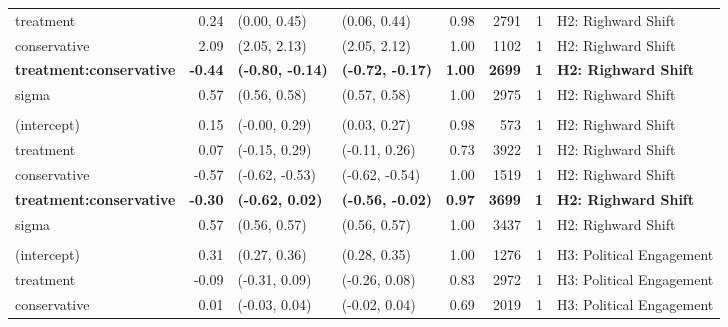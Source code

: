 \begin{table}[!h]
\begin{tabular}[t]{lrllrrrl}
\hspace{1em}treatment & 0.24 & (0.00, 0.45) & (0.06, 0.44) & 0.98 & 2791 & 1 & H2: Righward Shift\\
\hspace{1em}conservative & 2.09 & (2.05, 2.13) & (2.05, 2.12) & 1.00 & 1102 & 1 & H2: Righward Shift\\
\hspace{1em}\textbf{treatment:conservative} & \textbf{-0.44} & \textbf{(-0.80, -0.14)} & \textbf{(-0.72, -0.17)} & \textbf{1.00} & \textbf{2699} & \textbf{1} & \textbf{H2: Righward Shift}\\
\hspace{1em}sigma & 0.57 & (0.56, 0.58) & (0.57, 0.58) & 1.00 & 2975 & 1 & H2: Righward Shift\\
\addlinespace[0.3em]
\multicolumn{8}{l}{\textbf{Outcome: Obama approval}}\\
\hline
\hspace{1em}(intercept) & 0.15 & (-0.00, 0.29) & (0.03, 0.27) & 0.98 & 573 & 1 & H2: Righward Shift\\
\hspace{1em}treatment & 0.07 & (-0.15, 0.29) & (-0.11, 0.26) & 0.73 & 3922 & 1 & H2: Righward Shift\\
\hspace{1em}conservative & -0.57 & (-0.62, -0.53) & (-0.62, -0.54) & 1.00 & 1519 & 1 & H2: Righward Shift\\
\hspace{1em}\textbf{treatment:conservative} & \textbf{-0.30} & \textbf{(-0.62, 0.02)} & \textbf{(-0.56, -0.02)} & \textbf{0.97} & \textbf{3699} & \textbf{1} & \textbf{H2: Righward Shift}\\
\hspace{1em}sigma & 0.57 & (0.56, 0.57) & (0.56, 0.57) & 1.00 & 3437 & 1 & H2: Righward Shift\\
\addlinespace[0.3em]
\multicolumn{8}{l}{\textbf{Outcome: political participation}}\\
\hline
\hspace{1em}(intercept) & 0.31 & (0.27, 0.36) & (0.28, 0.35) & 1.00 & 1276 & 1 & H3: Political Engagement\\
\hspace{1em}treatment & -0.09 & (-0.31, 0.09) & (-0.26, 0.08) & 0.83 & 2972 & 1 & H3: Political Engagement\\
\hspace{1em}conservative & 0.01 & (-0.03, 0.04) & (-0.02, 0.04) & 0.69 & 2019 & 1 & H3: Political Engagement\\

\end{tabular}
\end{table}
